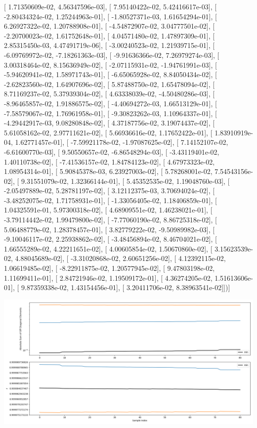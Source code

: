 \documentclass{article}
\begin{document}
       [  1.71350609e-02,   4.56347596e-03],
       [  7.95140422e-02,   5.42416617e-03],
       [ -2.80434324e-02,   1.25244963e-01],
       [ -1.80527371e-03,   1.61654294e-01],
       [  6.26927322e-02,   1.20788908e-01],
       [ -4.54872907e-02,   3.04777501e-02],
       [ -2.20700023e-02,   1.61752648e-01],
       [  4.04571480e-02,   1.47897309e-01],
       [  2.85315450e-03,   4.47491719e-06],
       [ -3.00240523e-02,   1.21939715e-01],
       [ -6.09769972e-02,  -7.18261363e-03],
       [ -9.91636366e-02,   7.26979274e-03],
       [  3.00318464e-02,   8.15636949e-02],
       [ -2.07115931e-02,  -1.94761991e-03],
       [ -5.94620941e-02,   1.58971743e-01],
       [ -6.65065928e-02,   8.84050434e-02],
       [ -2.62823560e-02,   1.64907696e-02],
       [  5.87488750e-02,   1.65478094e-02],
       [  8.71169237e-02,   5.37939304e-02],
       [  4.63338039e-02,  -4.50480286e-03],
       [ -8.96465857e-02,   1.91886575e-02],
       [ -4.40694272e-03,   1.66513129e-01],
       [ -7.58579067e-02,   1.76961958e-01],
       [ -9.30823262e-03,   1.10964337e-01],
       [ -4.29442917e-03,   9.08280848e-02],
       [  4.37187756e-02,   3.19074437e-02],
       [  5.61058162e-02,   2.97711621e-02],
       [  5.66936616e-02,   1.17652422e-01],
       [  1.83910919e-04,   1.62771457e-01],
       [ -7.59921178e-02,  -1.97087625e-02],
       [  7.14152107e-02,  -6.61600770e-03],
       [  9.50550657e-02,  -6.86548294e-03],
       [ -3.43119401e-02,   1.40110738e-02],
       [ -7.41536157e-02,   1.84784123e-02],
       [  4.67973323e-02,   1.08954314e-01],
       [  5.90845378e-03,   6.23927003e-02],
       [  5.78268001e-02,   7.54543156e-02],
       [  9.31551079e-02,   1.32366144e-01],
       [  5.45352535e-02,   1.19048760e-03],
       [ -2.05497889e-02,   5.28781197e-02],
       [  3.12112375e-03,   3.70694024e-02],
       [ -3.48252075e-02,   1.71758931e-01],
       [ -1.33056405e-02,   1.18406859e-01],
       [  1.04325591e-01,   5.97300318e-02],
       [  4.68909551e-02,   1.46238021e-01],
       [ -3.79114442e-02,   1.99479800e-02],
       [ -7.77060190e-02,   8.86725318e-02],
       [  5.06488779e-02,   1.28378457e-01],
       [  3.82779222e-02,  -9.50989982e-03],
       [ -9.10046117e-02,   2.25938862e-02],
       [ -3.48456894e-02,   8.46704021e-02],
       [  1.66555289e-02,   4.22211651e-02],
       [  4.00605854e-02,   1.50670860e-02],
       [  3.15623539e-02,   4.88045689e-02],
       [ -3.31020868e-02,   2.60651256e-02],
       [  4.12392115e-02,   1.06619485e-02],
       [ -8.22911875e-02,   1.20577945e-02],
       [  9.47803198e-02,   1.11699411e-01],
       [  2.84721946e-02,   1.19509172e-01],
       [  4.36274205e-02,   1.51613606e-01],
       [  9.87359338e-02,   1.43154456e-01],
       [  3.20411706e-02,   8.38963541e-02]])]
\begin{center}
\includegraphics[scale=.9]{report_pickled_controls178/control_dpn_all.png}

\end{center}
\end{document}
